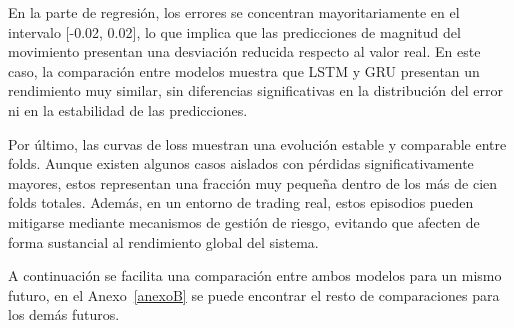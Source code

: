 En la parte de regresión, los errores se concentran mayoritariamente en el intervalo [-0.02, 0.02], lo que implica que las predicciones de magnitud
del movimiento presentan una desviación reducida respecto al valor real. En este caso, la comparación entre modelos muestra que LSTM y GRU presentan
un rendimiento muy similar, sin diferencias significativas en la distribución del error ni en la estabilidad de las predicciones.

Por último, las curvas de loss muestran una evolución estable y comparable entre folds. Aunque existen algunos casos aislados con pérdidas
significativamente mayores, estos representan una fracción muy pequeña dentro de los más de cien folds totales. Además, en un entorno de trading real,
estos episodios pueden mitigarse mediante mecanismos de gestión de riesgo, evitando que afecten de forma sustancial al rendimiento global del sistema.

A continuación se facilita una comparación entre ambos modelos para un mismo futuro, en el Anexo~\ref{anexoB} se puede encontrar el resto de
comparaciones para los demás futuros.

